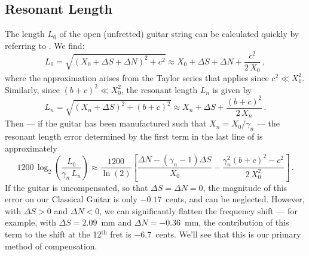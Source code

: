  \subsection{Resonant Length}
The length $L_0$ of the open (unfretted) guitar string can be calculated quickly by referring to . We find:
 \begin{equation}  \label{eqn:l_0_def}
L_0 = \sqrt{\left(X_0 + \Delta S + \Delta N\right)^2 + c^2} \approx X_0 + \Delta S + \Delta N + \frac{c^2}{2\, X_0}\, ,
 \end{equation}
where the approximation arises from the Taylor series that applies since $c^2 \ll X_0^2$. Similarly, since $(b + c)^2 \ll X_0^2$, the resonant length $L_n$ is given by
 \begin{equation}  \label{eqn:l_n_def}
L_n = \sqrt{\left(X_n + \Delta S\right)^2 + (b + c)^2} \approx X_n + \Delta S + \frac{(b + c)^2}{2\, X_n}\, .
 \end{equation}
Then --- if the guitar has been manufactured such that $X_n = X_0 / \gamma_n$ --- the resonant length error determined by the first term in the last line of  is approximately
  \begin{equation} \label{eqn:rle_approx}
  1200\, \log_2 \left( \frac{L_0}{\gamma_n\, L_n} \right) \approx \frac{1200}{\ln(2)} \left[ \frac{\Delta N - \left(\gamma_n - 1\right) \Delta S}{X_0} - \frac{\gamma_n^2 (b + c)^2 - c^2}{2\, X_0^2}\right]\, .
  \end{equation}
If the guitar is uncompensated, so that $\Delta S = \Delta N = 0$, the magnitude of this error on our Classical Guitar is only $-0.17$~cents, and can be neglected. However, with $\Delta S > 0$ and $\Delta N < 0$, we can significantly flatten the frequency shift --- for example, with $\Delta S = 2.09$~mm and $\Delta N = -0.36$~mm, the contribution of this term to the shift at the 12$^\text{th}$ fret is $-6.7$~cents. We'll see that this is our primary method of compensation.

